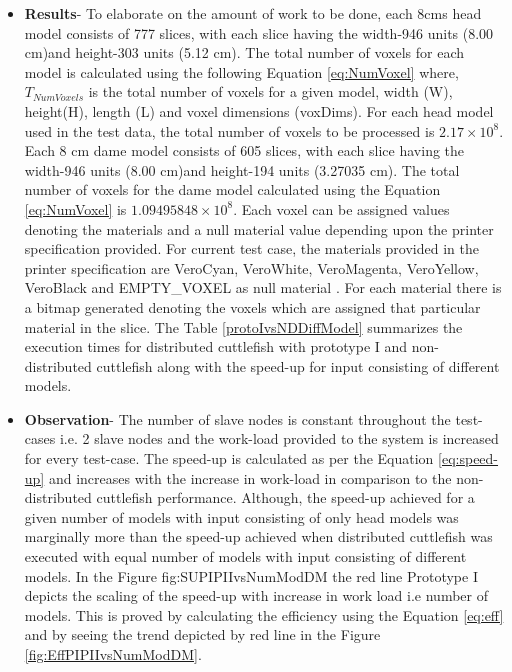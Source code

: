 \begin{enumerate}
\begin{itemize}
\item{\textbf{Results}}- To elaborate on the amount of work to be done, each 8cms head model consists of 777 slices, with each slice having the width-946 units (8.00 cm)and height-303 units (5.12 cm). The total number of voxels for each model is calculated using the following Equation \ref{eq:NumVoxel} where, \begin{math} T_{NumVoxels} \end{math} is the total number of voxels for a given model, width (W), height(H), length (L) and voxel dimensions (voxDims). For each head model used in the test data, the total number of voxels to be processed is \begin{math} 2.17 \times 10^{8} \end{math}. Each 8 cm dame model consists of 605 slices, with each slice having the width-946 units (8.00 cm)and height-194 units (3.27035 cm). The total number of voxels for the dame model calculated using the Equation \ref{eq:NumVoxel} is  \begin{math} 1.09495848 \times 10^{8} \end{math}. Each voxel can be assigned values denoting the materials and a null material value depending upon the printer specification provided. For current test case, the materials provided in the printer specification are VeroCyan, VeroWhite, VeroMagenta, VeroYellow, VeroBlack and EMPTY\_VOXEL as null material . For each material there is a bitmap generated denoting the voxels which are assigned that particular material in the slice. The Table \ref{protoIvsNDDiffModel} summarizes the execution times for distributed cuttlefish with prototype I and non-distributed cuttlefish along with the speed-up for input consisting of different models.  
\item{\textbf{Observation}}-  The number of slave nodes is constant throughout the test-cases i.e. 2 slave nodes and the work-load provided to the system is increased for every test-case. The speed-up is calculated as per the Equation \ref{eq:speed-up} and increases with the increase in work-load in comparison to the non-distributed cuttlefish performance. Although, the speed-up achieved for a given number of models with input consisting of only head models was marginally more than the speed-up achieved when distributed cuttlefish was executed with equal number of models with input consisting of different models. In the Figure {fig:SUPIPIIvsNumModDM} the red line Prototype I depicts the scaling of the speed-up with increase in work load i.e number of models. This is proved by calculating the efficiency using the Equation \ref{eq:eff} and by seeing the trend depicted by red line in the Figure \ref{fig:EffPIPIIvsNumModDM}. 
\end{itemize}
\end{enumerate}

